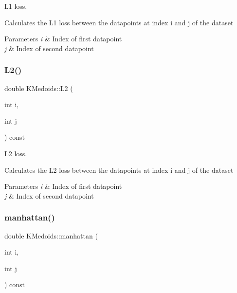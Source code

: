 L1 loss. 

Calculates the L1 loss between the datapoints at index i and j of the dataset


\begin{DoxyParams}{Parameters}
{\em i} & Index of first datapoint \\
\hline
{\em j} & Index of second datapoint \\
\hline
\end{DoxyParams}
\mbox{\label{classKMedoids_aa92fa87d17f16b85010b9215c21e0093}} 
\subsubsection{\texorpdfstring{L2()}{L2()}}
{\footnotesize\ttfamily double K\+Medoids\+::\+L2 (\begin{DoxyParamCaption}\item[{int}]{i,  }\item[{int}]{j }\end{DoxyParamCaption}) const\hspace{0.3cm}{\ttfamily [private]}}



L2 loss. 

Calculates the L2 loss between the datapoints at index i and j of the dataset


\begin{DoxyParams}{Parameters}
{\em i} & Index of first datapoint \\
\hline
{\em j} & Index of second datapoint \\
\hline
\end{DoxyParams}
\mbox{\label{classKMedoids_a08aecc8d7107b61d85bff4b4d5d73ebd}} 
\subsubsection{\texorpdfstring{manhattan()}{manhattan()}}
{\footnotesize\ttfamily double K\+Medoids\+::manhattan (\begin{DoxyParamCaption}\item[{int}]{i,  }\item[{int}]{j }\end{DoxyParamCaption}) const\hspace{0.3cm}{\ttfamily [private]}}



